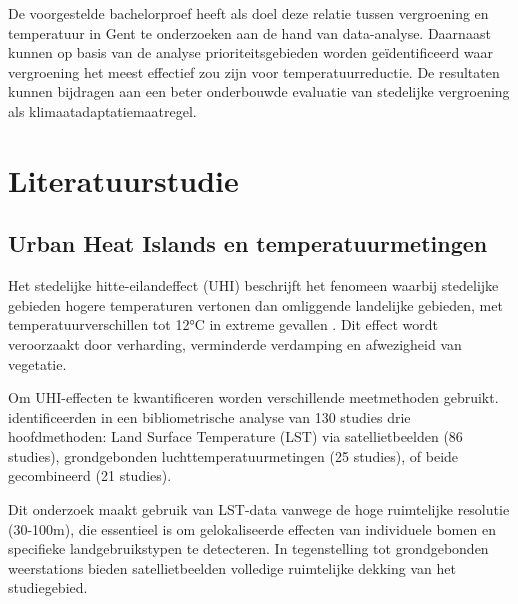 De voorgestelde bachelorproef heeft als doel deze relatie tussen vergroening en temperatuur in Gent te onderzoeken 
aan de hand van data-analyse.
Daarnaast kunnen op basis van de analyse prioriteitsgebieden worden geïdentificeerd waar vergroening het meest 
effectief zou zijn voor temperatuurreductie.
De resultaten kunnen bijdragen aan een beter onderbouwde evaluatie van stedelijke vergroening als klimaatadaptatiemaatregel.


\section{Literatuurstudie}%
\label{sec:literatuurstudie}



\subsection{Urban Heat Islands en temperatuurmetingen}

Het stedelijke hitte-eilandeffect (UHI) beschrijft het fenomeen waarbij 
stedelijke gebieden hogere temperaturen vertonen dan omliggende 
landelijke gebieden, met temperatuurverschillen tot 12°C in extreme 
gevallen \autocite{Phelan2015, Zheng2026}. Dit effect wordt veroorzaakt 
door verharding, verminderde verdamping en afwezigheid van vegetatie.

Om UHI-effecten te kwantificeren worden verschillende meetmethoden 
gebruikt. \textcite{Moncada-Morales2025} identificeerden in een 
bibliometrische analyse van 130 studies drie hoofdmethoden: Land Surface 
Temperature (LST) via satellietbeelden (86 studies), grondgebonden 
luchttemperatuurmetingen (25 studies), of beide gecombineerd (21 studies).

Dit onderzoek maakt gebruik van LST-data vanwege de hoge ruimtelijke 
resolutie (30-100m), die essentieel is om gelokaliseerde effecten van 
individuele bomen en specifieke landgebruikstypen te detecteren. In 
tegenstelling tot grondgebonden weerstations bieden satellietbeelden 
volledige ruimtelijke dekking van het studiegebied.


